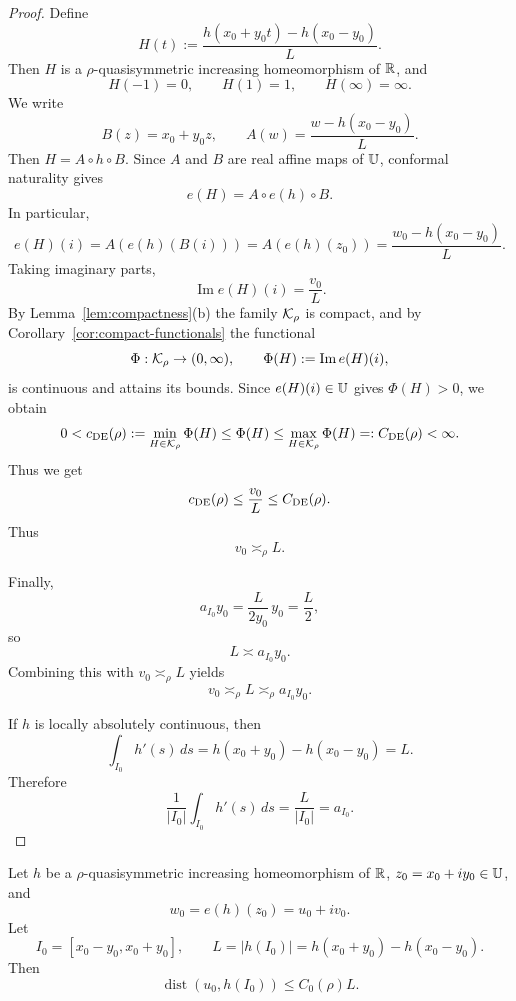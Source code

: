 \begin{proof}
	Define
	\[
	H(t):=\frac{h(x_0+y_0t)-h(x_0-y_0)}{L}.
	\]
	Then $H$ is a $\rho$-quasisymmetric increasing homeomorphism of
	$\mathbb{R}$, and
	\[
	H(-1)=0,\qquad H(1)=1,\qquad H(\infty)=\infty.
	\]
	We write
	\[
	B(z)=x_0+y_0z,
	\qquad
	A(w)=\frac{w-h(x_0-y_0)}{L}.
	\]
	Then $H=A\circ h\circ B$. Since $A$ and $B$ are real affine
	maps of $\mathbb{U}$, conformal naturality gives
	\[
	e(H)=A\circ e(h)\circ B.
	\]
	In particular,
	\[
	e(H)(i)
	=
	A(e(h)(B(i)))
	=
	A(e(h)(z_0))
	=
	\frac{w_0-h(x_0-y_0)}{L}.
	\]
	Taking imaginary parts,
	\[
	\operatorname{Im}e(H)(i)=\frac{v_0}{L}.
	\]
	By Lemma~\ref{lem:compactness}(b) the family $\mathcal{K}_\rho$ is compact, and by
	Corollary~\ref{cor:compact-functionals} the functional
	\[
	\Phi:\mathcal{K}_\rho\to(0,\infty),\qquad \Phi(H):=\operatorname{Im}e(H)(i),
	\]
	is continuous and attains its bounds. Since $e(H)(i)\in\mathbb{U}$ gives
	$\Phi(H)>0$, we obtain
	\[
	0<c_{\rm DE}(\rho):=\min_{H\in\mathcal{K}_\rho}\Phi(H)\le\Phi(H)\le
	\max_{H\in\mathcal{K}_\rho}\Phi(H)=:C_{\rm DE}(\rho)<\infty .
	\]
	Thus we get
	\[
	c_{\rm DE}(\rho)
	\le
	\frac{v_0}{L}
	\le
	C_{\rm DE}(\rho).
	\]
	Thus
	\[
	v_0\asymp_\rho L.
	\]
	
	Finally,
	\[
	a_{I_0}y_0=\frac{L}{2y_0}\,y_0=\frac{L}{2},
	\]
	so
	\[
	L\asymp a_{I_0}y_0.
	\]
	Combining this with $v_0\asymp_\rho L$ yields
	\[
	v_0\asymp_\rho L\asymp_\rho a_{I_0}y_0.
	\]
	
	If $h$ is locally absolutely continuous, then
	\[
	\int_{I_0}h'(s)\,ds
	=
	h(x_0+y_0)-h(x_0-y_0)
	=
	L.
	\]
	Therefore
	\[
	\frac1{|I_0|}\int_{I_0}h'(s)\,ds
	=
	\frac{L}{|I_0|}
	=
	a_{I_0}.
	\]
\end{proof}
\begin{corollary}\label{cor:real-loc}
	Let $h$ be a $\rho$-quasisymmetric increasing homeomorphism of $\mathbb{R}$,
	$z_0=x_0+iy_0\in\mathbb{U}$, and
	\[
	w_0=e(h)(z_0)=u_0+iv_0.
	\]
	Let
	\[
	I_0=[x_0-y_0,x_0+y_0],
	\qquad
	L=|h(I_0)|=h(x_0+y_0)-h(x_0-y_0).
	\]
	Then
	\[
	\operatorname{dist}(u_0,h(I_0))\le C_0(\rho)L.
	\]
\end{corollary}

